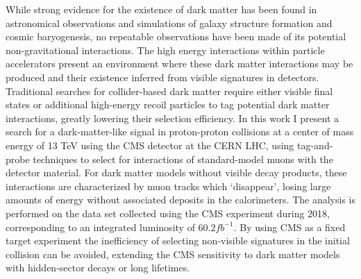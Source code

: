 While strong evidence for the existence of dark matter has been found in astronomical observations and simulations of galaxy structure formation and cosmic baryogenesis, no repeatable observations have been made of its potential non-gravitational interactions. 
The high energy interactions within particle accelerators present an environment where these dark matter interactions may be produced and their existence inferred from visible signatures in detectors. 
Traditional searches for collider-based dark matter require either visible final states or additional high-energy recoil particles to tag potential dark matter interactions, greatly lowering their selection efficiency. 
In this work I present a search for a dark-matter-like signal in proton-proton collisions at a center of mass energy of 13 TeV using the CMS detector at the CERN LHC, using tag-and-probe techniques to select for interactions of standard-model muons with the detector material.
For dark matter models without visible decay products, these interactions are characterized by muon tracks which `disappear', losing large amounts of energy without associated deposits in the calorimeters.
The analysis is performed on the data set collected using the CMS experiment during 2018, corresponding to an integrated luminosity of 60.2$fb^{-1}$.
By using CMS as a fixed target experiment the inefficiency of selecting non-visible signatures in the initial collision can be avoided, extending the CMS sensitivity to dark matter models with hidden-sector decays or long lifetimes.

